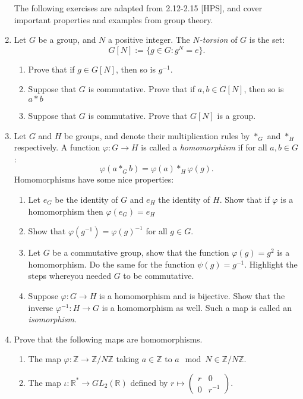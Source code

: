 \documentclass[11pt]{article}
\newcommand{\bR}{\mathbb{R}}
\newcommand{\bZ}{\mathbb{Z}}
\begin{document}
\begin{enumerate}
  The following exercises are adapted from 2.12-2.15 [HPS], and cover important properties and examples from group theory.
  \item{
  Let $G$ be a group, and $N$ a positive integer.  The \textit{$N$-torsion} of $G$ is the set:
  \[G[N]:=\{g\in G:g^N = e\}.\]
  \begin{enumerate}
    \item{
    Prove that if $g\in G[N]$, then so is $g^{-1}$.
    }
    \item{
    Suppose that $G$ is commutative.  Prove that if $a,b\in G[N]$, then so is $a*b$
    }
    \item{
    Suppose that $G$ is commutative.  Prove that $G[N]$ is a group.
    }
  \end{enumerate}
  }
  \item{
  Let $G$ and $H$ be groups, and denote their multiplication rules by $*_G$ and $*_H$ respectively.  A function $\varphi:G\to H$ is called a \textit{homomorphism} if for all $a,b\in G$:
  \[\varphi(a*_G b) = \varphi(a)*_H\varphi(g).\]
  Homomorphisms have some nice properties:
  \begin{enumerate}
    \item{
    Let $e_G$ be the identity of $G$ and $e_H$ the identity of $H$.  Show that if $\varphi$ is a homomorphism then $\varphi(e_G) = e_H$
    }
    \item{
    Show that $\varphi(g^{-1})=\varphi(g)^{-1}$ for all $g\in G$.
    }
    \item{
    Let $G$ be a commutative group, show that the function $\varphi(g) = g^2$ is a homomorphism.  Do the same for the function $\psi(g) = g^{-1}$.  Highlight the steps whereyou needed $G$ to be commutative.
    }
    \item{
    Suppose $\varphi:G\to H$ is a homomorphism and is bijective.  Show that the inverse $\varphi^{-1}:H\to G$ is a homomorphism as well.  Such a map is called an \textit{isomorphism}.
    }
  \end{enumerate}
  }
  \item{
  Prove that the following maps are homomorphisms.
  \begin{enumerate}
    \item{
    The map $\varphi:\bZ\to\bZ/N\bZ$ taking $a\in\bZ$ to $a\mod N\in\bZ/N\bZ$.
    }
    \item{
    The map $\iota:\bR^*\to GL_2(\bR)$ defined by $r\mapsto\begin{pmatrix}r&0\\0&r^{-1}\end{pmatrix}$.
}
\end{enumerate}}
\end{enumerate}
\end{document}
